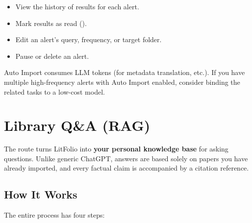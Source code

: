 \begin{itemize}
  \item View the history of results for each alert.
  \item Mark results as read ().
  \item Edit an alert's query, frequency, or target folder.
  \item Pause or delete an alert.
\end{itemize}

\begin{warnbox}
Auto Import consumes LLM tokens (for metadata translation, etc.). If you have multiple
high-frequency alerts with Auto Import enabled, consider binding the related tasks to a low-cost
model.
\end{warnbox}

\chapter{Library Q\&A (RAG)}
\label{ch:ask}

The  route turns LitFolio into \textbf{your personal knowledge base} for asking
questions. Unlike generic ChatGPT, answers are based solely on papers you have already imported,
and every factual claim is accompanied by a \cmd{[N]} citation reference.

\section{How It Works}


The entire process has four steps:

